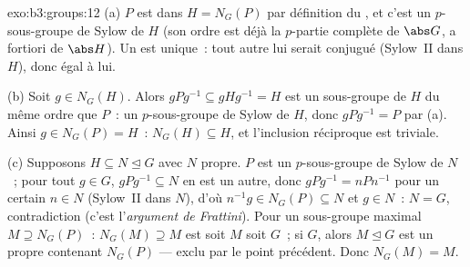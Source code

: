 \begin{solution}{exo:b3:groups:12}
(a) $P$ est  dans $H = N_G(P)$ par définition du
, et c'est un $p$-sous-groupe de Sylow de $H$ (son
ordre est déjà la $p$-partie complète de $\abs G$, a fortiori de
$\abs H$). Un   est unique~: tout autre
lui serait conjugué (Sylow~II dans $H$), donc égal à lui.

(b) Soit $g \in N_G(H)$. Alors $gPg^{-1} \subseteq gHg^{-1} = H$
est un sous-groupe de $H$ du même ordre que $P$~: un
$p$-sous-groupe de Sylow de $H$, donc $gPg^{-1} = P$ par (a).
Ainsi $g \in N_G(P) = H$~: $N_G(H) \subseteq H$, et l'inclusion
réciproque est triviale.

(c) Supposons $H \subseteq N \trianglelefteq G$ avec $N$ propre.
$P$ est un $p$-sous-groupe de Sylow de $N$~; pour tout $g \in G$,
$gPg^{-1} \subseteq N$ en est un autre, donc $gPg^{-1} =
nPn^{-1}$ pour un certain $n \in N$ (Sylow~II dans $N$), d'où
$n^{-1}g \in N_G(P) \subseteq N$ et $g \in N$~: $N = G$,
contradiction (c'est l'\emph{argument de Frattini}). Pour un
sous-groupe maximal $M \supseteq N_G(P)$~: $N_G(M) \supseteq M$
est soit $M$ soit $G$~; si $G$, alors $M \trianglelefteq G$ est
un  propre contenant $N_G(P)$ --- exclu par le
point précédent. Donc $N_G(M) = M$.
\end{solution}

